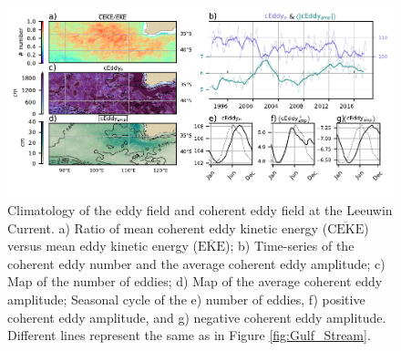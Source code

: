 \documentclass[draft,linenumbers]{agujournal2019}
\newcommand{\MEKE}{\overline{\textrm{EKE}}}
\newcommand{\EKE}{\textrm{EKE}}
\newcommand{\MCEKE}{\overline{\textrm{CEKE}}}
\begin{document}
	
	\begin{figure}
	    \centering
	    \includegraphics[width=1\textwidth]{figures/regional_ratios_and_stats_V3_0.pdf}
	    \caption{Climatology of the eddy field and coherent eddy field at the Leeuwin Current. a) Ratio of mean coherent eddy kinetic energy ($\MCEKE$) versus mean eddy kinetic energy ($\MEKE$); b) Time-series of the coherent eddy number and the average coherent eddy amplitude; c) Map of the number of eddies; d) Map of the average coherent eddy amplitude; Seasonal cycle of the e) number of eddies, f) positive coherent eddy amplitude, and g) negative coherent eddy amplitude. Different lines represent the same as in Figure \ref{fig:Gulf_Stream}.}
	    \label{fig:leeuwin_cycle}
	\end{figure}
\end{document}
